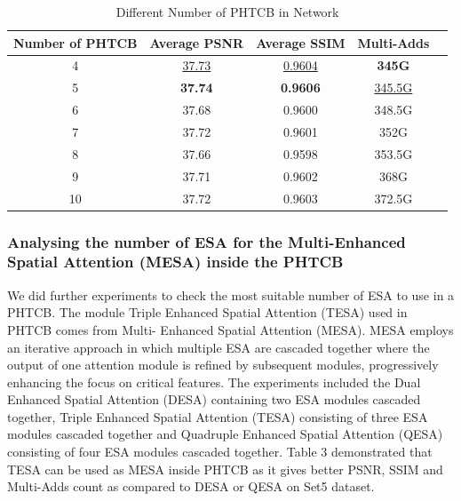 \documentclass{ieeeaccess}
\begin{document}
\begin{table}
  \caption{Different Number  of PHTCB in Network}
  \begin{tabular}{|c|c|c|c|c|} %
    \hline
    \textbf{Number of  PHTCB } & \textbf{Average PSNR} & \textbf{Average SSIM} & \textbf{Multi-Adds} \\
    \hline
    4   & {\color{blue}\underline{37.73}}   & {\color{blue}\underline{0.9604}}  & {\color{red}\textbf{345G}}\\
    5   & {\color{red}\textbf{37.74}}   & {\color{red}\textbf{0.9606}}   & {\color{blue}\underline{345.5G}}\\
    6   & 37.68   & 0.9600   & 348.5G\\
    7   & 37.72   & 0.9601   & 352G\\
    8   & 37.66   & 0.9598   & 353.5G\\    
    9   & 37.71   & 0.9602   & 368G\\
    10   & 37.72   & 0.9603   & 372.5G\\
    \hline
  \end{tabular}
\end{table}



\subsubsection{Analysing the number of ESA for the Multi-Enhanced Spatial Attention (MESA) inside the PHTCB}

We did further experiments to check the most suitable number of ESA to use in a PHTCB. The module Triple Enhanced Spatial Attention (TESA) used in PHTCB comes from Multi- Enhanced Spatial Attention (MESA). MESA employs an iterative approach in which multiple ESA are cascaded together where the output of one attention module is refined by subsequent modules, progressively enhancing the focus on critical features. The experiments included the Dual Enhanced Spatial Attention (DESA) containing two ESA modules cascaded together, Triple Enhanced Spatial Attention (TESA) consisting of three ESA modules cascaded together and Quadruple Enhanced Spatial Attention (QESA) consisting of four ESA modules cascaded together. Table 3 demonstrated that TESA can be used as MESA inside PHTCB as it gives better PSNR, SSIM and Multi-Adds count as compared to DESA or QESA on Set5 dataset.
\end{document}
